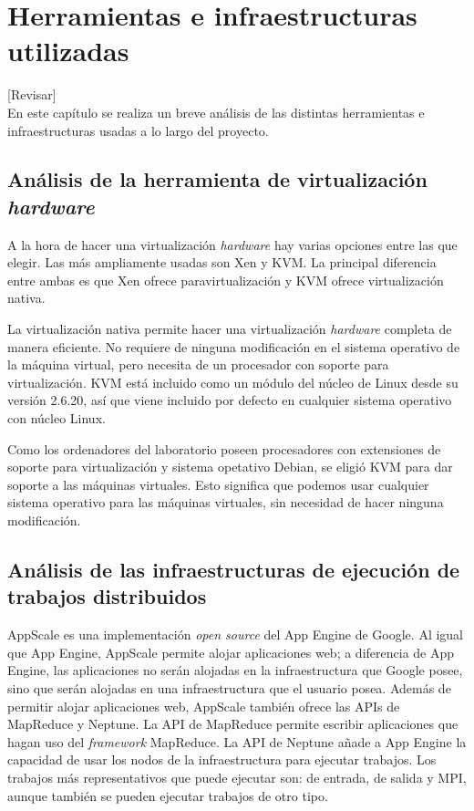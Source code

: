 \chapter{Herramientas e infraestructuras utilizadas}
\label{cap:analisis}

[Revisar]\\

En este capítulo se realiza un breve análisis de las distintas herramientas e infraestructuras usadas a lo largo del proyecto.


\section{Análisis de la herramienta de virtualización \emph{hardware}}

A la hora de hacer una virtualización \emph{hardware} hay varias opciones entre las que elegir. Las más ampliamente usadas son Xen y KVM. La principal diferencia entre ambas es que Xen ofrece paravirtualización y KVM ofrece virtualización nativa.

La virtualización nativa permite hacer una virtualización \emph{hardware} completa de manera eficiente. No requiere de ninguna modificación en el sistema operativo de la máquina virtual, pero necesita de un procesador con soporte para virtualización. KVM está incluido como un módulo del núcleo de Linux desde su versión 2.6.20, así que viene incluido por defecto en cualquier sistema operativo con núcleo Linux.

Como los ordenadores del laboratorio poseen procesadores con extensiones de soporte para virtualización y sistema opetativo Debian, se eligió KVM para dar soporte a las máquinas virtuales. Esto significa que podemos usar cualquier sistema operativo para las máquinas virtuales, sin necesidad de hacer ninguna modificación.


\section{Análisis de las infraestructuras de ejecución de trabajos distribuidos}

AppScale es una implementación \emph{open source} del App Engine de Google. Al igual que App Engine, AppScale permite alojar aplicaciones web; a diferencia de App Engine, las aplicaciones no serán alojadas en la infraestructura que Google posee, sino que serán alojadas en una infraestructura que el usuario posea. Además de permitir alojar aplicaciones web, AppScale también ofrece las APIs de MapReduce y Neptune. La API de MapReduce permite escribir aplicaciones que hagan uso del \emph{framework} MapReduce. La API de Neptune añade a App Engine la capacidad de usar los nodos de la infraestructura para ejecutar trabajos. Los trabajos más representativos que puede ejecutar son: de entrada, de salida y MPI, aunque también se pueden ejecutar trabajos de otro tipo.

